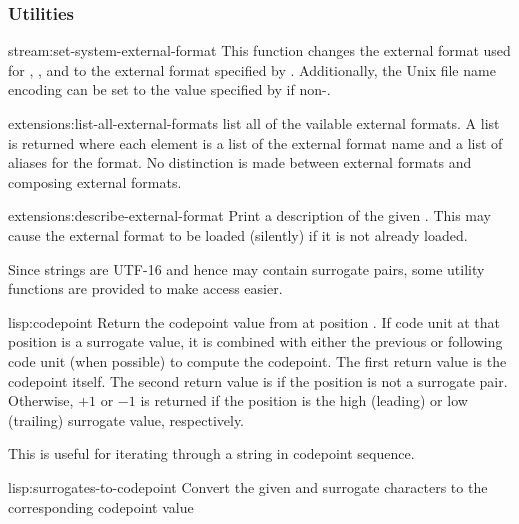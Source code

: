 \subsubsection{Utilities}

\begin{defun}{stream:}{set-system-external-format}{ \ampoptional{} }
  This function changes the external format used for
  , , and
   to the external format specified by
  .  Additionally, the Unix file name encoding can be
  set to the value specified by  if non-\nil.
\end{defun}

\begin{defun}{extensions:}{list-all-external-formats}{}
  list all of the vailable external formats.  A list is returned where
  each element is a list of the external format name and a list of
  aliases for the format.  No distinction is made between external
  formats and composing external formats.
\end{defun}

\begin{defun}{extensions:}{describe-external-format}{}
  Print a description of the given .  This may
  cause the external format to be loaded (silently) if it is not
  already loaded.
\end{defun}

Since strings are UTF-16 and hence may contain surrogate pairs, some
utility functions are provided to make access easier.

\begin{defun}{lisp:}{codepoint}{\args {} 
    \ampoptional{} }
  Return the codepoint value from  at position .
  If code unit at that position is a surrogate value, it is combined
  with either the previous or following code unit (when possible) to
  compute the codepoint.  The first return value is the codepoint
  itself.  The second return value is \nil{} if the position is not a
  surrogate pair.  Otherwise, $+1$ or $-1$ is returned if the position
  is the high (leading) or low (trailing) surrogate value, respectively.

  This is useful for iterating through a string in codepoint sequence.
\end{defun}

\begin{defun}{lisp:}{surrogates-to-codepoint}{\args {} }
  Convert the given  and  surrogate characters to the
  corresponding codepoint value
\end{defun}

